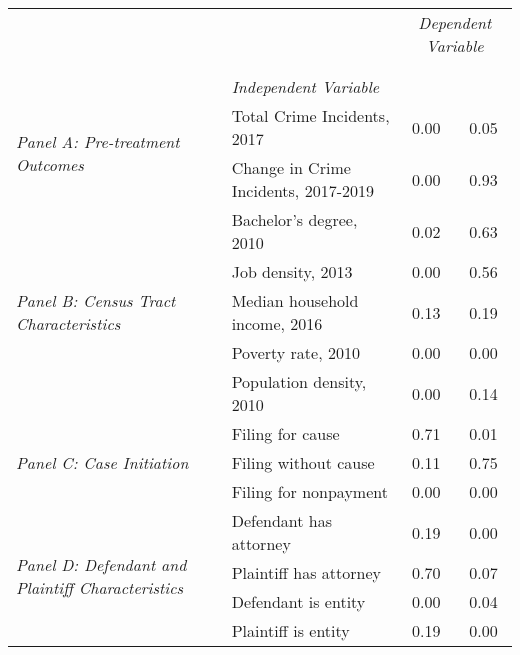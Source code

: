 \begin{tabular}{llcc}
\toprule
 &  & \multicolumn{2}{c}{\textit{Dependent Variable}} \\
\cline{3-4}
\\
 &  &  &  \\
 & \emph{Independent Variable} &  &  \\
\midrule
\multirow[c]{2}{3cm}{\textit{Panel A: Pre-treatment Outcomes}} & Total Crime Incidents, 2017 & 0.00 & 0.05 \\
 & Change in Crime Incidents, 2017-2019 & 0.00 & 0.93 \\
\cline{1-4}
\multirow[c]{5}{3cm}{\textit{Panel B: Census Tract Characteristics}} & Bachelor's degree, 2010 & 0.02 & 0.63 \\
 & Job density, 2013 & 0.00 & 0.56 \\
 & Median household income, 2016 & 0.13 & 0.19 \\
 & Poverty rate, 2010 & 0.00 & 0.00 \\
 & Population density, 2010 & 0.00 & 0.14 \\
\cline{1-4}
\multirow[c]{3}{3cm}{\textit{Panel C: Case Initiation}} & Filing for cause & 0.71 & 0.01 \\
 & Filing without cause & 0.11 & 0.75 \\
 & Filing for nonpayment & 0.00 & 0.00 \\
\cline{1-4}
\multirow[c]{4}{3cm}{\textit{Panel D: Defendant and Plaintiff Characteristics}} & Defendant has attorney & 0.19 & 0.00 \\
 & Plaintiff has attorney & 0.70 & 0.07 \\
 & Defendant is entity & 0.00 & 0.04 \\
 & Plaintiff is entity & 0.19 & 0.00 \\
\cline{1-4}
\bottomrule
\end{tabular}
